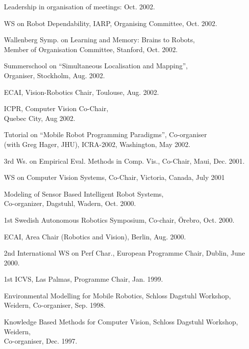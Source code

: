 \documentclass{article}
\begin{document}
\begin{cv}
\begin{cvlist}{Leadership in organisation of meetings:}
  \cftdotfill{\cftdotsep} Oct. 2002.
  \item WS on Robot Dependability, IARP, Organising Committee,
  \cftdotfill{\cftdotsep} Oct. 2002.
  \item Wallenberg Symp. on Learning and Memory: Brains to Robots,\\
  Member of Organisation Committee, Stanford, \cftdotfill{\cftdotsep} Oct. 2002.
  \item Summerschool on ``Simultaneous Localisation and Mapping'', \\Organiser,
  Stockholm, \cftdotfill{\cftdotsep}Aug. 2002.
  \item ECAI, Vision-Robotics Chair, Toulouse, \cftdotfill{\cftdotsep} Aug.
  2002.
  \item ICPR, Computer Vision Co-Chair,\\ Quebec City, \cftdotfill{\cftdotsep}
  Aug 2002.
  \item Tutorial on ``Mobile Robot Programming Paradigms'', Co-organiser\\ (with
  Greg Hager, JHU), ICRA-2002, Washington, \cftdotfill{\cftdotsep}May 2002.
  \item 3rd Ws. on Empirical Eval. Methods in Comp. Vis., Co-Chair, Maui,
  \cftdotfill{\cftdotsep} Dec. 2001.
  \item WS on Computer Vision Systems, Co-Chair, Victoria,
  Canada,\cftdotfill{\cftdotsep} July 2001
  \item Modeling of Sensor Based Intelligent Robot Systems,\\
  Co-organizer, Dagstuhl, Wadern, \cftdotfill{\cftdotsep} Oct. 2000.
  \item 1st Swedish Autonomous Robotics Symposium, Co-chair, \"Orebro,
  \cftdotfill{\cftdotsep}Oct. 2000.
  \item ECAI, Area Chair (Robotics and Vision), Berlin, \cftdotfill{\cftdotsep}
  Aug. 2000.
  \item 2nd International WS on Perf Char., European Programme Chair,
  Dublin,\cftdotfill{\cftdotsep} June 2000.
  \item 1st ICVS, Las Palmas, Programme Chair, \cftdotfill{\cftdotsep} Jan.
  1999.
  \item Environmental Modelling for Mobile Robotics, Schloss Dagstuhl
  Workshop,\\ Weidern, Co-organiser, \cftdotfill{\cftdotsep} Sep. 1998.
  \item Knowledge Based Methods for Computer Vision, Schloss Dagstuhl Workshop,
  Weidern,\\ Co-organiser, \cftdotfill{\cftdotsep} Dec. 1997.

\end{cvlist}
\end{cv}
\end{document}
